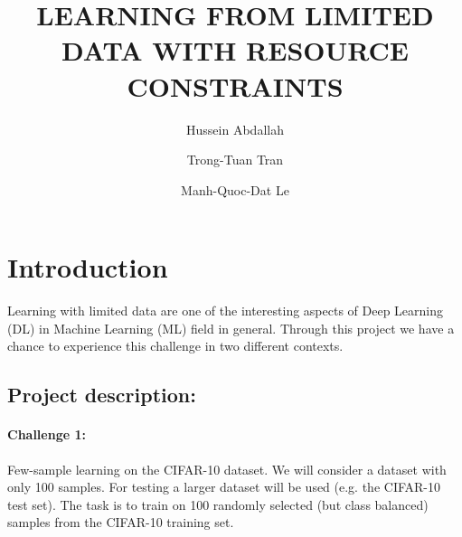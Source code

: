 \documentclass[10pt,twocolumn,letterpaper]{article}
\begin{document}
\title{LEARNING FROM LIMITED DATA WITH RESOURCE CONSTRAINTS}
\author{ Hussein Abdallah \and Trong-Tuan Tran \and Manh-Quoc-Dat Le}
\maketitle


\section{Introduction}

Learning with limited data are one of the interesting aspects of Deep Learning (DL) in Machine Learning (ML) field in general. Through this project we have a chance to experience this challenge in two different contexts.   

\subsection{Project description:}


\paragraph{Challenge 1:}
Few-sample learning on the CIFAR-10 dataset. We will consider a dataset with only 100 samples. For testing a larger dataset will be used (e.g. the CIFAR-10 test set).
The task is to train on 100 randomly selected (but class balanced) samples from the CIFAR-10 training set.
\end{document}
